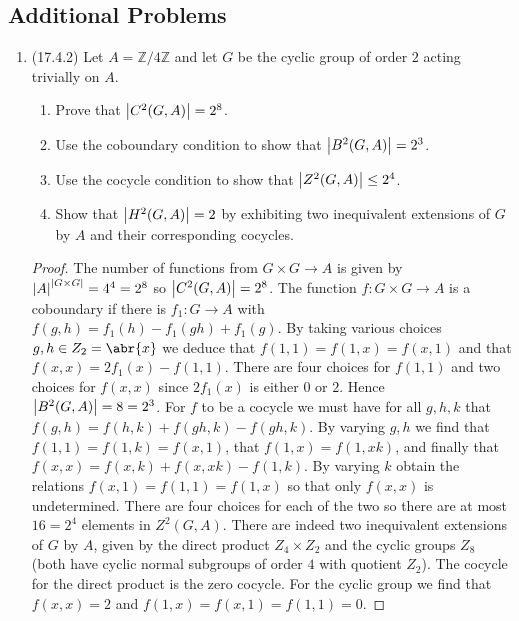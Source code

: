\documentclass[11pt]{article}
\DeclareMathOperator\Aut{Aut}
\begin{document}
\subsection*{Additional Problems}
\begin{enumerate}
    \item (17.4.2) Let $A=\mathbb{Z}/4\mathbb{Z}$ and let $G$ be the cyclic group of order $2$ acting trivially on $A$.\begin{enumerate}
        \item Prove that $\abs{C^2(G,A)} = 2^8$. 
        \item Use the coboundary condition to show that $\abs{B^2(G,A)} = 2^3$.
        \item Use the cocycle condition to show that $\abs{Z^2(G,A)} \leq 2^4$. 
        \item Show that $\abs{H^2(G,A)} = 2$ by exhibiting two inequivalent extensions of $G$ by $A$ and their corresponding cocycles.
    \end{enumerate} \begin{proof}
        The number of functions from $G\times G\to A$ is given by $\abs{A}^{\abs{G\times G}} = 4^4 = 2^8$ so $\abs{C^2(G,A)} = 2^8$. The function $f\colon G\times G\to A$ is a coboundary if there is $f_1\colon G\to A$ with $f(g,h) = f_1(h)-f_1(gh)+f_1(g)$. By taking various choices $g,h\in Z_2 = \abr{x}$ we deduce that $f(1,1) = f(1,x) = f(x,1)$ and that $f(x,x) = 2f_1(x)-f(1,1)$. There are four choices for $f(1,1)$ and two choices for $f(x,x)$ since $2f_1(x)$ is either $0$ or $2$. Hence $\abs{B^2(G,A)} = 8 = 2^3$. For $f$ to be a cocycle we must have for all $g,h,k$ that $f(g,h) = f(h,k)+f(gh,k)-f(gh,k)$. By varying $g,h$ we find that $f(1,1) = f(1,k) = f(x,1)$, that $f(1,x) = f(1,xk)$, and finally that $f(x,x) = f(x,k)+ f(x,xk)-f(1,k)$. By varying $k$ obtain the relations $f(x,1) = f(1,1) = f(1,x)$ so that only $f(x,x)$ is undetermined. There are four choices for each of the two so there are at most $16 = 2^4$ elements in $Z^2(G,A)$. There are indeed two inequivalent extensions of $G$ by $A$, given by the direct product $Z_4\times Z_2$ and the cyclic groups $Z_8$ (both have cyclic normal subgroups of order $4$ with quotient $Z_2$). The cocycle for the direct product is the zero cocycle. For the cyclic group we find that $f(x,x) = 2$ and $f(1,x) = f(x,1) = f(1,1)= 0$. 

\end{proof}
\end{enumerate}
\end{document}
